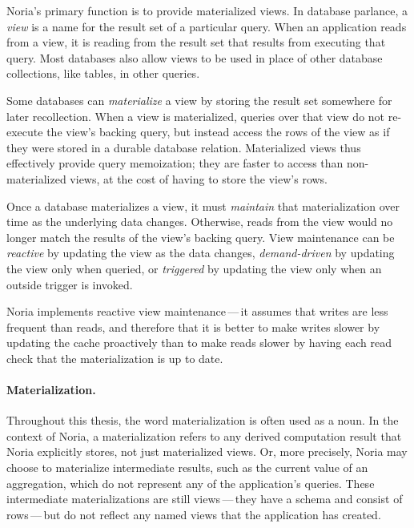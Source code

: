 \resume


Noria's primary function is to provide materialized views. In database parlance,
a \textit{view} is a name for the result set of a particular query. When an
application reads from a view, it is reading from the result set that results
from executing that query. Most databases also allow views to be used in place
of other database collections, like tables, in other queries.

Some databases can \textit{materialize} a view by storing the result set
somewhere for later recollection. When a view is materialized, queries over that
view do not re-execute the view's backing query, but instead access the rows of
the view as if they were stored in a durable database relation. Materialized
views thus effectively provide query memoization; they are faster to access than
non-materialized views, at the cost of having to store the view's rows.

Once a database materializes a view, it must \textit{maintain} that
materialization over time as the underlying data changes. Otherwise, reads from
the view would no longer match the results of the view's backing query. View
maintenance can be \emph{reactive} by updating the view as the data changes,
\emph{demand-driven} by updating the view only when queried, or \emph{triggered}
by updating the view only when an outside trigger is invoked.

Noria implements reactive view maintenance\,---\,it assumes that writes are less
frequent than reads, and therefore that it is better to make writes slower by
updating the cache proactively than to make reads slower by having each read
check that the materialization is up to date.

\paragraph{Materialization.}
Throughout this thesis, the word materialization is often used as a noun. In the
context of Noria, a materialization refers to any derived computation result
that Noria explicitly stores, not just materialized views. Or, more precisely,
Noria may choose to materialize intermediate results, such as the current value
of an aggregation, which do not represent any of the application's queries.
These intermediate materializations are still views\,---\,they have a schema and
consist of rows\,---\,but do not reflect any named views that the application
has created.

